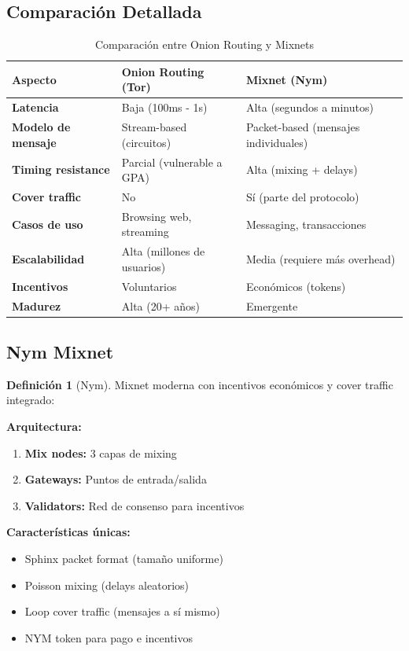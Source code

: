 \documentclass[11pt,a4paper,twoside]{book}
\theoremstyle{definition}
\newtheorem{definition}{Definición}[chapter]
\theoremstyle{remark}
\begin{document}
\subsection{Comparación Detallada}

\begin{table}[htbp]
\centering
\small
\begin{tabular}{lp{4cm}p{4cm}}
\toprule
\textbf{Aspecto} & \textbf{Onion Routing (Tor)} & \textbf{Mixnet (Nym)} \\
\midrule
\textbf{Latencia} & Baja (100ms - 1s) & Alta (segundos a minutos) \\
\textbf{Modelo de mensaje} & Stream-based (circuitos) & Packet-based (mensajes individuales) \\
\textbf{Timing resistance} & Parcial (vulnerable a GPA) & Alta (mixing + delays) \\
\textbf{Cover traffic} & No & Sí (parte del protocolo) \\
\textbf{Casos de uso} & Browsing web, streaming & Messaging, transacciones \\
\textbf{Escalabilidad} & Alta (millones de usuarios) & Media (requiere más overhead) \\
\textbf{Incentivos} & Voluntarios & Económicos (tokens) \\
\textbf{Madurez} & Alta (20+ años) & Emergente \\
\bottomrule
\end{tabular}
\caption{Comparación entre Onion Routing y Mixnets}
\end{table}

\subsection{Nym Mixnet}

\begin{definition}[Nym]
Mixnet moderna con incentivos económicos y cover traffic integrado:

\textbf{Arquitectura:}
\begin{enumerate}
    \item \textbf{Mix nodes:} 3 capas de mixing
    \item \textbf{Gateways:} Puntos de entrada/salida
    \item \textbf{Validators:} Red de consenso para incentivos
\end{enumerate}

\textbf{Características únicas:}
\begin{itemize}
    \item Sphinx packet format (tamaño uniforme)
    \item Poisson mixing (delays aleatorios)
    \item Loop cover traffic (mensajes a sí mismo)
    \item NYM token para pago e incentivos
\end{itemize}
\end{definition}
\end{document}
